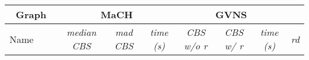 \documentclass{scrartcl}
\theoremstyle{plain}
\newcommand{\algo}{MaCH}
\newcommand{\gvns}{GVNS}
\newcommand{\cbs}{CBS}
\begin{document}
\begin{table}[!ht]
	\centering
	\scriptsize
	\begin{tabular}{|lll|rrr|rrr|r|}
	\hline
\multicolumn{3}{|c}{\textbf{Graph}} &  
\multicolumn{3}{|c|}{\textbf{\algo{}}} & 
\multicolumn{3}{c|}{\textbf{\gvns{}}} & \\ \hline

\multicolumn{1}{|c}{Name} & 
\multicolumn{1}{c}{} & 
\multicolumn{1}{c|}{} &

\multicolumn{1}{c}{\emph{median \cbs{}}} & 
\multicolumn{1}{c}{\emph{mad \cbs{}}} & 
\multicolumn{1}{c|}{ \emph{time (s)}} &

\multicolumn{1}{c}{\emph{\cbs{} w/o r}} &
\multicolumn{1}{c}{\emph{\cbs{} w/ r}} &
\multicolumn{1}{c|}{ \emph{time (s)}} &
\multicolumn{1}{c|}{\emph{rd}} \\ 
\hline


\end{tabular}
\end{table}
\end{document}
